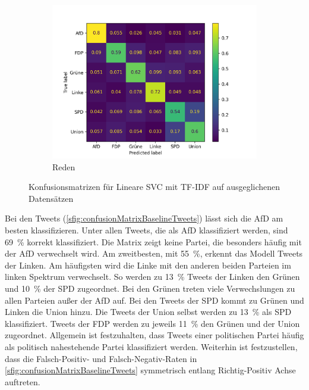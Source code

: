 \begin{figure}[H]
    \hfill
    \begin{subfigure}{0.49\textwidth}
        \includegraphics[width=\textwidth]{data/images/modeling/baseline/under/speeches_confusion_matrix.png}
        \caption{Reden}
        \label{sfig:confusionMatrixBaselineSpeeches}
    \end{subfigure}
    \caption{Konfusionsmatrizen für Lineare \acs{SVC} mit \acs{TF-IDF} auf ausgeglichenen Datensätzen} \label{fig:confusionMatrixBaseline}
\end{figure}

Bei den Tweets (\autoref{sfig:confusionMatrixBaselineTweets}) lässt sich die \ac{AfD} am besten klassifizieren. Unter allen Tweets, die als \ac{AfD} klassifiziert werden, sind \SI{69}{\percent} korrekt klassifiziert. Die Matrix zeigt keine Partei, die besonders häufig mit der \ac{AfD} verwechselt wird. Am zweitbesten, mit \SI{55}{\percent}, erkennt das Modell Tweets der Linken. Am häufigsten wird die Linke mit den anderen beiden Parteien im linken Spektrum verwechselt. So werden zu \SI{13}{\percent} Tweets der Linken den Grünen und \SI{10}{\percent} der \ac{SPD} zugeordnet. Bei den Grünen treten viele Verwechslungen zu allen Parteien außer der \ac{AfD} auf. Bei den Tweets der \ac{SPD} kommt zu Grünen und Linken die Union hinzu. Die Tweets der Union selbst werden zu \SI{13}{\percent} als \ac{SPD} klassifiziert. Tweets der \ac{FDP} werden zu jeweils \SI{11}{\percent} den Grünen und der Union zugeordnet. Allgemein ist festzuhalten, dass Tweets einer politischen Partei häufig als politisch nahestehende Partei klassifiziert werden. Weiterhin ist festzustellen, dass die Falsch-Positiv- und Falsch-Negativ-Raten in \autoref{sfig:confusionMatrixBaselineTweets} symmetrisch entlang Richtig-Positiv Achse auftreten.

